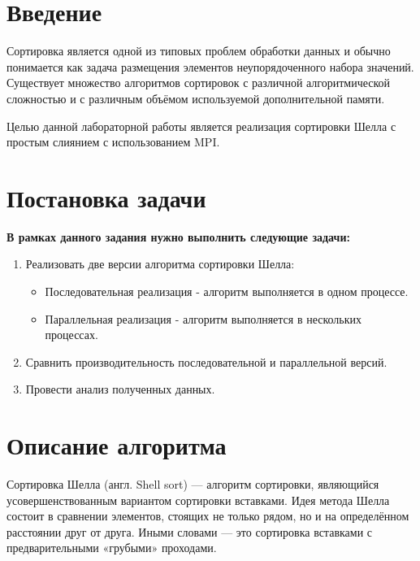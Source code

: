 \documentclass{report}
\begin{document}
\setcounter{page}{2}

\tableofcontents
\newpage

\section*{Введение}
\par Сортировка является одной из типовых проблем обработки данных и обычно понимается как задача размещения элементов неупорядоченного набора значений. Существует множество алгоритмов сортировок с различной алгоритмической сложностью и с различным объёмом используемой дополнительной памяти.

\par Целью данной лабораторной работы является реализация сортировки Шелла с простым слиянием с использованием MPI.

\newpage

\section*{Постановка задачи}
\par \textbf{В рамках данного задания нужно выполнить следующие задачи:}
\begin{enumerate}
    \item Реализовать две версии алгоритма сортировки Шелла:
    \begin{itemize}
    \item Последовательная реализация - алгоритм выполняется в одном процессе.
    \item Параллельная реализация - алгоритм выполняется в нескольких процессах. 
    \end{itemize}
    \item Сравнить производительность последовательной и параллельной версий.
    \item Провести анализ полученных данных.
\end{enumerate}
\newpage

\section*{Описание алгоритма}
\par Сортировка Шелла (англ. Shell sort) — алгоритм сортировки, являющийся усовершенствованным вариантом сортировки вставками. Идея метода Шелла состоит в сравнении элементов, стоящих не только рядом, но и на определённом расстоянии друг от друга. Иными словами — это сортировка вставками с предварительными «грубыми» проходами.
\end{document}
